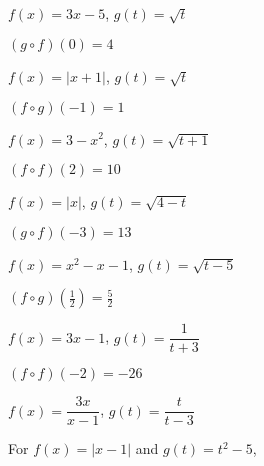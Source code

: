 \documentclass{ximera}
\begin{document}
\begin{question}
$f(x) = 3x-5$, $g(t) = \sqrt{t}$ 

\begin{solution}
$(g\circ f)(0) = 4$
\end{solution}

\end{question}

\begin{question}
$f(x) = |x+1|$, $g(t) = \sqrt{t}$
\begin{solution}
$(f\circ g)(-1) = 1$
\end{solution}

\end{question}

\begin{question}
$f(x) = 3-x^2$, $g(t) = \sqrt{t+1}$ 

\begin{solution}
$(f \circ f)(2) = 10$








\end{solution}

\end{question}

\begin{question}
$f(x) = |x|$, $g(t) = \sqrt{4-t}$
\begin{solution}
$(g\circ f)(-3) = 13$
\end{solution}

\end{question}

\begin{question}
$f(x) = x^2-x-1$, $g(t) = \sqrt{t-5}$ 

\begin{solution}
$(f\circ g)\left(\frac{1}{2}\right) = \frac{5}{2}$
\end{solution}

\end{question}

\begin{question}
$f(x) = 3x-1$, $g(t) = \dfrac{1}{t+3}$
\begin{solution}
$(f \circ f)(-2) = -26$


\end{solution}

\end{question}

\begin{question}
$f(x) = \dfrac{3x}{x-1}$, $g(t) =\dfrac{t}{t-3}$

\begin{solution}
For   $f(x) = |x-1|$ and $g(t) = t^2-5$,



\end{solution}

\end{question}
\end{document}
